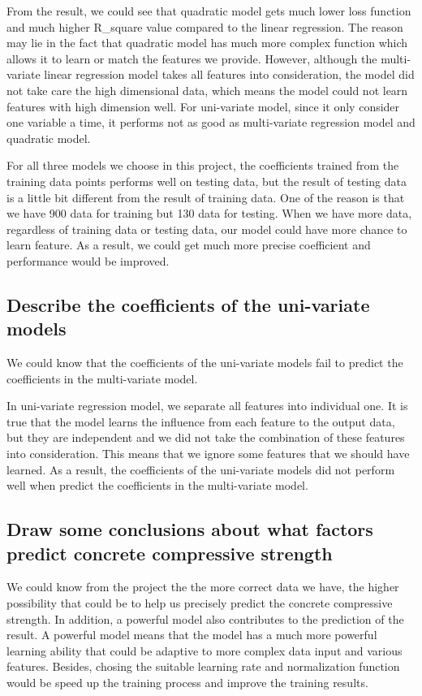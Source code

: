 \documentclass{article}
\begin{document}
From the result, we could see that quadratic model gets much lower loss function and much higher R\_square value compared to the linear regression. The reason may lie in the fact that quadratic model has much more complex function which allows it to learn or match the features we provide. However, although the multi-variate linear regression model takes all features into consideration, the model did not take care the high dimensional data, which means the model could not learn features with high dimension well. For uni-variate model, since it only consider one variable a time, it performs not as good as multi-variate regression model and quadratic model.

For all three models we choose in this project, the coefficients trained from the training data points performs well on testing data, but the result of testing data is a little bit different from the result of training data. One of the reason is that we have 900 data for training but 130 data for testing. When we have more data, regardless of training data or testing data, our model could have more chance to learn feature. As a result, we could get much more precise coefficient and performance would be improved.



\subsection{Describe the coefficients of the uni-variate models}
We could know that the coefficients of the uni-variate models fail to predict the coefficients in the multi-variate model. 

In uni-variate regression model, we separate all features into individual one. It is true that the model learns the influence from each feature to the output data, but they are independent and we did not take the combination of these features into consideration. This means that we ignore some features that we should have learned. As a result, the coefficients of the uni-variate models did not perform well when predict the coefficients in the multi-variate model.


\subsection{Draw some conclusions about what factors predict concrete compressive strength}
We could know from the project the the more correct data we have, the higher possibility that could be to help us precisely predict the concrete compressive strength. In addition, a powerful model also contributes to the prediction of the result. A powerful model means that the model has a much more powerful learning ability that could be adaptive to more complex data input and various features. Besides, chosing the suitable learning rate and normalization function would be speed up the training process and improve the training results.
\end{document}
